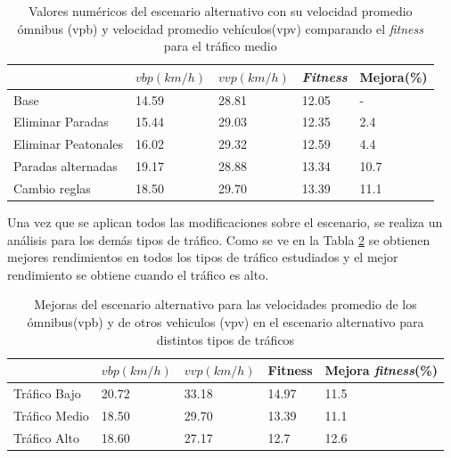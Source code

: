 \begin{table}[H]
	\renewcommand{\arraystretch}{1.2}
	\caption[Valores numéricos del escenario alternativo]{Valores numéricos del escenario alternativo con su velocidad promedio ómnibus (vpb) y velocidad promedio vehículos(vpv) comparando el \emph{fitness} para el tráfico medio }
	\label{table:resultado_alternativo}
	\centering
	\begin{tabular}{p{3.5cm}p{2.5cm}p{2.5cm}p{2cm}p{2cm} }
		\hline
		&
		$vbp(km/h)$& 
		$vvp(km/h)$ & 
		\emph{Fitness} &
		Mejora(\%)
		\\ 
		\hline
		Base & 14.59  & 28.81& 12.05 & -\\
		Eliminar Paradas & 15.44  & 29.03& 12.35 & 2.4\\
		Eliminar Peatonales  & 16.02  & 29.32& 12.59 & 4.4\\
		Paradas alternadas  & 19.17  & 28.88& 13.34 & 10.7\\	
		Cambio reglas  & 18.50  & 29.70& 13.39 & 11.1\\				
		\hline
	\end{tabular}
\end{table}

Una vez que se aplican todos las modificaciones sobre el escenario, se realiza un análisis para los demás tipos de tráfico. Como se ve en la Tabla \ref{table:mejoras_trafico_alternativo} se obtienen mejores rendimientos en todos los tipos de tráfico estudiados y el mejor rendimiento se obtiene cuando el tráfico es alto. 

\begin{table}[H]
	\renewcommand{\arraystretch}{1.2}
	\caption[Mejoras del escenario alternativo.]{Mejoras del escenario alternativo  para las velocidades promedio de los ómnibus(vpb) y de otros vehiculos (vpv) en el escenario alternativo para distintos tipos de tráficos }
	\label{table:mejoras_trafico_alternativo}
	\centering
	\begin{tabular}{p{3.5cm}p{2.5cm}p{2.5cm}p{2cm}p{2cm} }
		\hline
		&
		$vbp(km/h)$& 
		$vvp(km/h)$ & 
		Fitness &
		Mejora \emph{fitness}(\%)
		\\ 
		\hline

		Tráfico Bajo & 20.72  & 33.18 & 14.97 & 11.5\\
		Tráfico Medio & 18.50  & 29.70& 13.39 & 11.1 \\
		Tráfico Alto  & 18.60  & 27.17& 12.7 & 12.6\\		
		\hline
	\end{tabular}
\end{table}

